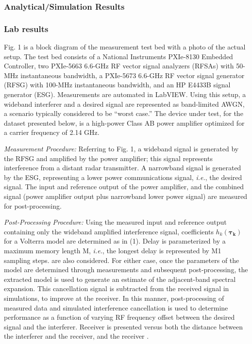 \subsubsection{Analytical/Simulation Results}
\subsubsection{Lab results}

Fig. 1 is a block diagram of the measurement test bed with a photo of the actual setup.  The test bed consists of a National Instruments PXIe-8130 Embedded Controller, two PXIe-5663 6.6-GHz RF vector signal analyzers (RFSAs) with 50-MHz instantaneous bandwidth, a PXIe-5673 6.6-GHz RF vector signal generator (RFSG) with 100-MHz instantaneous bandwidth, and an HP E4433B signal generator  (ESG).  Measurements are automated in LabVIEW.  Using this setup, a wideband interferer and a desired signal are represented as band-limited AWGN, a scenario typically considered to be “worst case.”  The device under test, for the dataset presented below, is a high-power Class AB power amplifier optimized for a carrier frequency of 2.14 GHz.

\textit{Measurement Procedure: }
Referring to Fig. 1, a wideband signal is generated by the RFSG and amplified by the power amplifier; this signal represents interference from a distant radar transmitter.  A narrowband signal is generated by the ESG, representing a lower power communications signal, \emph{i.e.}, the desired signal.  The input and reference output of the power amplifier, and the combined signal (power amplifier output plus narrowband lower power signal) are measured for post-processing.

\textit{Post-Processing Procedure:}
Using the measured input and reference output containing only the wideband amplified interference signal, coefficients  $h_k( \boldsymbol{\tau_k})$ for a Volterra model are determined as in (1).  Delay is parameterized by a maximum memory length M, \emph{i.e.}, the longest delay is represented by M\hspace{1pt}\textendash\hspace{0.25pt}1 sampling steps.  \OMP are also considered.  For either case, once the parameters of the model are determined through measurements and subsequent post-processing, the extracted model is used to generate an estimate of the adjacent-band spectral expansion.  This cancellation signal is subtracted from the received signal in simulations, to improve \SINR at the receiver.  In this manner, post-processing of measured data and simulated interference cancellation is used to determine performance as a function of varying RF frequency offset between the desired signal and the interferer.  Receiver \SINR is presented versus both the distance between the interferer and the receiver, and the receiver \SNR.

